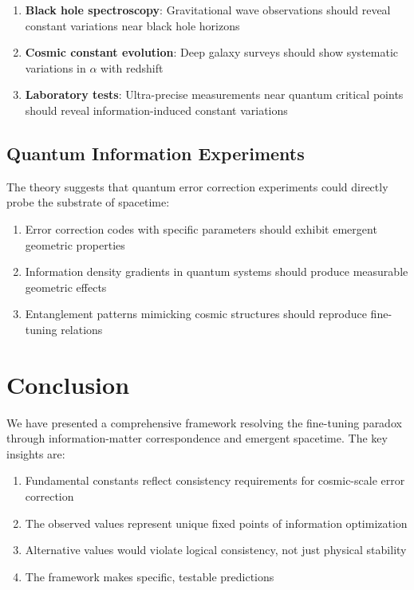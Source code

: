 \documentclass[12pt,a4paper]{article}
\begin{document}
\begin{enumerate}
\item \textbf{Black hole spectroscopy}: Gravitational wave observations should reveal constant variations near black hole horizons
\item \textbf{Cosmic constant evolution}: Deep galaxy surveys should show systematic variations in $\alpha$ with redshift
\item \textbf{Laboratory tests}: Ultra-precise measurements near quantum critical points should reveal information-induced constant variations
\end{enumerate}

\subsection{Quantum Information Experiments}

The theory suggests that quantum error correction experiments could directly probe the substrate of spacetime:

\begin{enumerate}
\item Error correction codes with specific parameters should exhibit emergent geometric properties
\item Information density gradients in quantum systems should produce measurable geometric effects
\item Entanglement patterns mimicking cosmic structures should reproduce fine-tuning relations
\end{enumerate}

\section{Conclusion}

We have presented a comprehensive framework resolving the fine-tuning paradox through information-matter correspondence and emergent spacetime. The key insights are:

\begin{enumerate}
\item Fundamental constants reflect consistency requirements for cosmic-scale error correction
\item The observed values represent unique fixed points of information optimization
\item Alternative values would violate logical consistency, not just physical stability
\item The framework makes specific, testable predictions
\end{enumerate}
\end{document}
